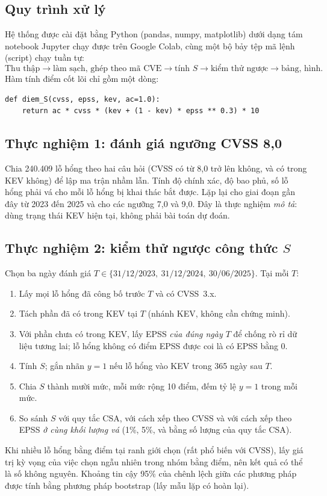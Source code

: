 \documentclass[runningheads]{llncs}
\begin{document}
\subsection{Quy trình xử lý}

Hệ thống được cài đặt bằng Python (pandas, numpy, matplotlib) dưới dạng tám notebook
Jupyter chạy được trên Google Colab, cùng một bộ bảy tệp mã lệnh (script) chạy tuần tự:
\[
\text{Thu thập} \rightarrow \text{làm sạch, ghép theo mã CVE} \rightarrow \text{tính } S
\rightarrow \text{kiểm thử ngược} \rightarrow \text{bảng, hình}.
\]
Hàm tính điểm cốt lõi chỉ gồm một dòng:
\begin{verbatim}
def diem_S(cvss, epss, kev, ac=1.0):
    return ac * cvss * (kev + (1 - kev) * epss ** 0.3) * 10
\end{verbatim}

\subsection{Thực nghiệm 1: đánh giá ngưỡng CVSS 8,0}

Chia 240.409 lỗ hổng theo hai câu hỏi (CVSS có từ 8,0 trở lên không, và có trong KEV không) để lập
ma trận nhầm lẫn. Tính độ chính xác, độ bao phủ, số lỗ hổng phải vá cho mỗi lỗ hổng bị khai
thác bắt được. Lặp lại cho giai đoạn gần đây từ 2023 đến 2025 và cho các ngưỡng 7,0 và 9,0. Đây là
thực nghiệm \emph{mô tả}: dùng trạng thái KEV hiện tại, không phải bài toán dự đoán.

\subsection{Thực nghiệm 2: kiểm thử ngược công thức $S$}

Chọn ba ngày đánh giá $T \in \{31/12/2023,\ 31/12/2024,\ 30/06/2025\}$. Tại mỗi $T$:
\begin{enumerate}
\item Lấy mọi lỗ hổng đã công bố trước $T$ và có CVSS~3.x.
\item Tách phần đã có trong KEV tại $T$ (nhánh KEV, không cần chứng minh).
\item Với phần chưa có trong KEV, lấy EPSS \emph{của đúng ngày $T$} để chống rò rỉ dữ liệu
tương lai; lỗ hổng không có điểm EPSS được coi là có EPSS bằng 0.
\item Tính $S$; gắn nhãn $y = 1$ nếu lỗ hổng vào KEV trong 365 ngày sau $T$.
\item Chia $S$ thành mười mức, mỗi mức rộng 10 điểm, đếm tỷ lệ $y=1$ trong mỗi mức.
\item So sánh $S$ với quy tắc CSA, với cách xếp theo CVSS và với cách xếp theo EPSS \emph{ở cùng khối lượng
vá} (1\%, 5\%, và bằng số lượng của quy tắc CSA).
\end{enumerate}
Khi nhiều lỗ hổng bằng điểm tại ranh giới chọn (rất phổ biến với CVSS), lấy giá trị kỳ vọng
của việc chọn ngẫu nhiên trong nhóm bằng điểm, nên kết quả có thể là số không nguyên. Khoảng tin cậy
95\% của chênh lệch giữa các phương pháp được tính bằng phương pháp bootstrap (lấy mẫu lặp có hoàn lại).
\end{document}
